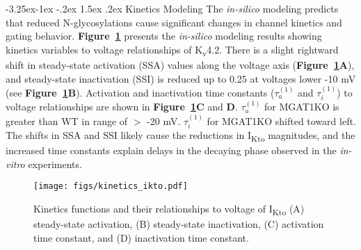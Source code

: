 \documentclass[11pt]{article}
\makeatletter
\renewcommand\subsection{\@startsection{subsection}{2}{\z@}%
                                     {-3.25ex\@plus -1ex \@minus -.2ex}%
                                     {1.5ex \@plus .2ex}%
                                     {\normalfont\fontfamily{phv}\fontsize{14}{17}\bfseries}}
\makeatother
\begin{document}
\subsection{Kinetics Modeling} \label{s:results.kinetics}
The \textit{in-silico} modeling predicts that reduced N-glycosylations cause significant changes in channel kinetics and gating behavior. \textbf{Figure~\ref{fig:kinetics_ikto}} presents the \textit{in-silico} modeling results showing kinetics variables to voltage relationships of K\textsubscript{v}4.2. There is a slight rightward shift in steady-state activation (SSA) values along the voltage axis (\textbf{Figure~\ref{fig:kinetics_ikto}A}), and steady-state inactivation (SSI) is reduced up to 0.25 at voltages lower -10 mV (see \textbf{Figure~\ref{fig:kinetics_ikto}B}). Activation and inactivation time constants ($\tau_{a}^{(1)}$ and $\tau_{i}^{(1)}$) to voltage relationships are shown in \textbf{Figure~\ref{fig:kinetics_ikto}C} and \textbf{D}. $\tau_{a}^{(1)}$ for MGAT1KO is greater than WT in range of $>$ -20 mV. $\tau_{i}^{(1)}$ for MGAT1KO shifted toward left. The shifts in SSA and SSI likely cause the reductions in I\textsubscript{Kto} magnitudes, and the increased time constants explain delays in the decaying phase observed in the \textit{in-vitro} experiments.
\begin{figure}[!ht]
    \centering
    \texttt{[image: figs/kinetics\_ikto.pdf]}
    \caption{Kinetics functions and their relationships to voltage of I\textsubscript{Kto} (A) steady-state activation, (B) steady-state inactivation, (C) activation time constant, and (D) inactivation time constant.}
    \label{fig:kinetics_ikto}
\end{figure}
\end{document}
